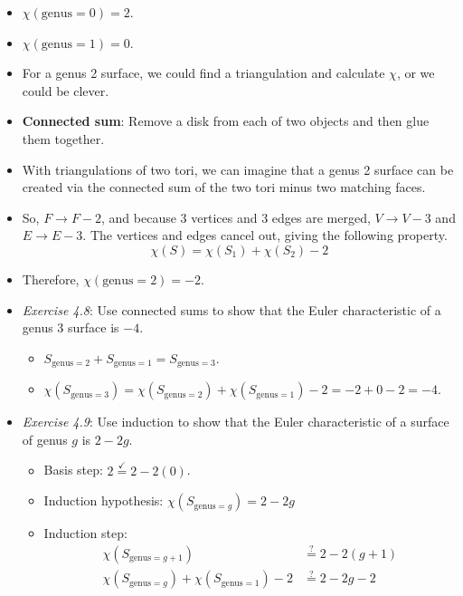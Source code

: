 \documentclass[titlepage]{article}
\numberwithin{figure}{section}
\numberwithin{table}{section}
\numberwithin{equation}{section}
\begin{document}
\begin{itemize}
\begin{itemize}
    \end{itemize}
    \item $\chi(\text{genus}=0)=2$.
    \item $\chi(\text{genus}=1)=0$.
    \item For a genus 2 surface, we could find a triangulation and calculate $\chi$, or we could be clever.
    \item \textbf{Connected sum}: Remove a disk from each of two objects and then glue them together.
    \item With triangulations of two tori, we can imagine that a genus 2 surface can be created via the connected sum of the two tori minus two matching faces.
    \item So, $F\rightarrow F-2$, and because 3 vertices and 3 edges are merged, $V\rightarrow V-3$ and $E\rightarrow E-3$. The vertices and edges cancel out, giving the following property.
    \begin{equation}
        \chi(S)=\chi\left( S_1 \right)+\chi\left( S_2 \right)-2
    \end{equation}
    \item Therefore, $\chi(\text{genus}=2)=-2$.
    \item \emph{Exercise 4.8}: Use connected sums to show that the Euler characteristic of a genus 3 surface is $-4$.
    \begin{itemize}
        \item $S_{\text{genus}=2}+S_{\text{genus}=1}=S_{\text{genus}=3}$.
        \item $\chi\left( S_{\text{genus}=3} \right)=\chi\left( S_{\text{genus}=2} \right)+\chi\left( S_{\text{genus}=1} \right)-2=-2+0-2=-4$.
    \end{itemize}
    \item \emph{Exercise 4.9}: Use induction to show that the Euler characteristic of a surface of genus $g$ is $2-2g$.
    \begin{itemize}
        \item Basis step: $2\overset{\checkmark}{=}2-2(0)$.
        \item Induction hypothesis: $\chi\left( S_{\text{genus}=g} \right)=2-2g$
        \item Induction step:
        \begin{align*}
            \chi\left( S_{\text{genus}=g+1} \right) &\overset{?}{=} 2-2(g+1)\\
            \chi\left( S_{\text{genus}=g} \right)+\chi\left( S_{\text{genus}=1} \right)-2 &\overset{?}{=} 2-2g-2\\

\end{align*}
\end{itemize}
\end{itemize}
\end{document}
